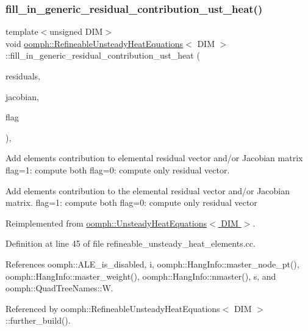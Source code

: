 \subsubsection{\texorpdfstring{fill\+\_\+in\+\_\+generic\+\_\+residual\+\_\+contribution\+\_\+ust\+\_\+heat()}{fill\_in\_generic\_residual\_contribution\_ust\_heat()}}
{\footnotesize\ttfamily template$<$unsigned D\+IM$>$ \\
void \hyperlink{classoomph_1_1RefineableUnsteadyHeatEquations}{oomph\+::\+Refineable\+Unsteady\+Heat\+Equations}$<$ D\+IM $>$\+::fill\+\_\+in\+\_\+generic\+\_\+residual\+\_\+contribution\+\_\+ust\+\_\+heat (\begin{DoxyParamCaption}\item[{\hyperlink{classoomph_1_1Vector}{Vector}$<$ double $>$ \&}]{residuals,  }\item[{\hyperlink{classoomph_1_1DenseMatrix}{Dense\+Matrix}$<$ double $>$ \&}]{jacobian,  }\item[{unsigned}]{flag }\end{DoxyParamCaption})\hspace{0.3cm}{\ttfamily [private]}, {\ttfamily [virtual]}}



Add element\textquotesingle{}s contribution to elemental residual vector and/or Jacobian matrix flag=1\+: compute both flag=0\+: compute only residual vector. 

Add element\textquotesingle{}s contribution to the elemental residual vector and/or Jacobian matrix. flag=1\+: compute both flag=0\+: compute only residual vector 

Reimplemented from \hyperlink{classoomph_1_1UnsteadyHeatEquations_acde24104d5adcabe8a76a3a52c17ab5f}{oomph\+::\+Unsteady\+Heat\+Equations$<$ D\+I\+M $>$}.



Definition at line 45 of file refineable\+\_\+unsteady\+\_\+heat\+\_\+elements.\+cc.



References oomph\+::\+A\+L\+E\+\_\+is\+\_\+disabled, i, oomph\+::\+Hang\+Info\+::master\+\_\+node\+\_\+pt(), oomph\+::\+Hang\+Info\+::master\+\_\+weight(), oomph\+::\+Hang\+Info\+::nmaster(), s, and oomph\+::\+Quad\+Tree\+Names\+::W.



Referenced by oomph\+::\+Refineable\+Unsteady\+Heat\+Equations$<$ D\+I\+M $>$\+::further\+\_\+build().

\mbox{\label{classoomph_1_1RefineableUnsteadyHeatEquations_ae39fad9e49a9fa1353c016633f66dc7d}} 
